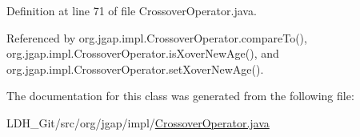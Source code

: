 Definition at line 71 of file Crossover\-Operator.\-java.



Referenced by org.\-jgap.\-impl.\-Crossover\-Operator.\-compare\-To(), org.\-jgap.\-impl.\-Crossover\-Operator.\-is\-Xover\-New\-Age(), and org.\-jgap.\-impl.\-Crossover\-Operator.\-set\-Xover\-New\-Age().



The documentation for this class was generated from the following file\-:\begin{DoxyCompactItemize}
\item 
L\-D\-H\-\_\-\-Git/src/org/jgap/impl/\hyperlink{_crossover_operator_8java}{Crossover\-Operator.\-java}\end{DoxyCompactItemize}
